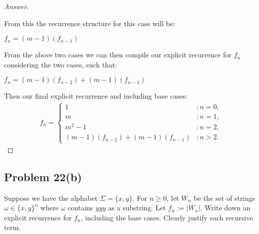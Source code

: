 \documentclass[11pt]{article}
\theoremstyle{definition}
\theoremstyle{definition}
\theoremstyle{definition}
\begin{document}
\begin{proof}[Answer]
\begin{itemize}
From this the recurrence structure for this case will be: \\
\begin{center}
$f_n = (m-1)(f_{n-1})$
\end{center}
\end{itemize}

From the above two cases we can then compile our explicit recurrence for $f_n$ considering the two cases, such that: \\
\begin{center}
$f_n = (m-1)(f_{n-2}) + (m-1)(f_{n-1})$
\end{center}
Then our final explicit recurrence and including base cases: \\
\begin{align*}
f_n = \begin{cases}
1 & : n = 0, \\
m & : n = 1, \\
m^2 - 1 & : n = 2, \\
(m-1)(f_{n-2}) + (m-1)(f_{n-1}) & : n > 2.
\end{cases}
\end{align*}
\end{proof}

\newpage
\subsection*{Problem 22(b)}

Suppose we have the alphabet $\Sigma = \{x, y\}$. For $n \geq 0$, let $W_{n}$ be the set of strings $\omega \in \{x, y\}^{n}$ where $\omega$ contains $yyy$ as a substring. Let $f_{n} := |W_{n}|$. Write down an explicit recurrence for $f_{n}$, including the base cases. Clearly justify each recursive term.
\end{document}
